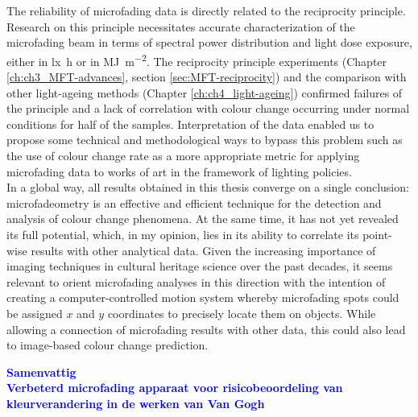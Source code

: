 The reliability of microfading data is directly related to the reciprocity principle. Research on this principle necessitates accurate characterization of the microfading beam in terms of spectral power distribution and light dose exposure, either in \unit{\lux\hour} or in \unit{\mega\joule\per\square\metre}. The reciprocity principle experiments (Chapter \ref{ch:ch3_MFT-advances}, section \ref{sec:MFT-reciprocity}) and the comparison with other light-ageing methods (Chapter \ref{ch:ch4_light-ageing}) confirmed failures of the principle and a lack of correlation with colour change occurring under normal conditions for half of the samples. Interpretation of the data enabled us to propose some technical and methodological ways to bypass this problem such as the use of colour change rate as a more appropriate metric for applying microfading data to works of art in the framework of lighting policies. \\

In a global way, all results obtained in this thesis converge on a single conclusion: microfadeometry is an effective and efficient technique for the detection and analysis of colour change phenomena. At the same time, it has not yet revealed its full potential, which, in my opinion, lies in its ability to correlate its point-wise results with other analytical data. Given the increasing importance of imaging techniques in cultural heritage science over the past decades, it seems relevant to orient microfading analyses in this direction with the intention of creating a computer-controlled motion system whereby microfading spots could be assigned $x$ and $y$ coordinates to precisely locate them on objects. While allowing a connection of microfading results with other data, this could also lead to image-based colour change prediction.

\newpage
\textbf{\textcolor{blue}{\LARGE Samenvattig}}\\

\textbf{\textcolor{blue}{Verbeterd microfading apparaat voor risicobeoordeling van kleurverandering in de werken van Van Gogh}}\\


